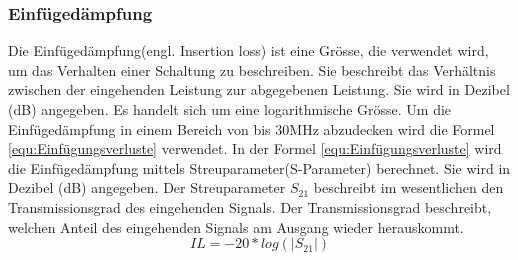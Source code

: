 \subsubsection{Einfügedämpfung}\label{subsec:einfuge}


Die Einfügedämpfung(engl. Insertion loss) ist eine Grösse, die verwendet wird, um das Verhalten einer Schaltung zu beschreiben. Sie beschreibt das Verhältnis zwischen der eingehenden Leistung zur abgegebenen Leistung. Sie wird in Dezibel (dB) angegeben. Es handelt sich um eine logarithmische Grösse. Um die Einfügedämpfung in einem Bereich von bis 30MHz abzudecken wird die Formel \ref{equ:Einfügungsverluste} verwendet. In der Formel \ref{equ:Einfügungsverluste} wird die Einfügedämpfung mittels Streuparameter(S-Parameter) berechnet. Sie wird in Dezibel (dB) angegeben. Der Streuparameter $S_{21}$ beschreibt im wesentlichen den Transmissionsgrad des eingehenden Signals. Der Transmissionsgrad beschreibt, welchen Anteil des eingehenden Signals am Ausgang wieder herauskommt.\\


\begin{equation}\label{equ:Einfügungsverluste}
	IL = -20*log (\left\lvert S_{21} \right\rvert)
\end{equation}

